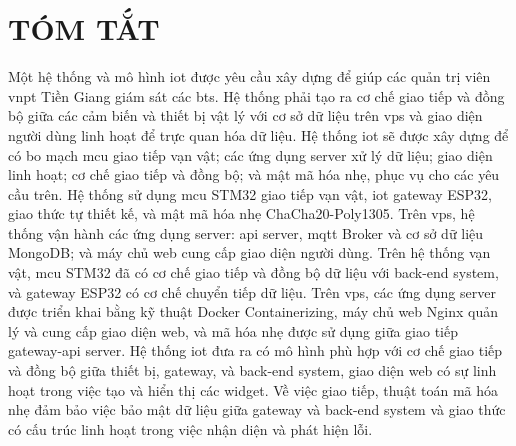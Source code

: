 \chapter*{TÓM TẮT}
\label{Abstract}

Một hệ thống và mô hình \acrfull{iot} được yêu cầu xây dựng để giúp các quản trị viên \acrfull{vnpt} Tiền Giang giám sát các \acrfull{bts}. Hệ thống phải tạo ra cơ chế giao tiếp và đồng bộ giữa các cảm biến và thiết bị vật lý với cơ sở dữ liệu trên \acrfull{vps} và giao diện người dùng linh hoạt để trực quan hóa dữ liệu. 
Hệ thống \acrshort{iot} sẽ được xây dựng để có bo mạch \acrfull{mcu} giao tiếp vạn vật; các ứng dụng server xử lý dữ liệu; giao diện linh hoạt; cơ chế giao tiếp và đồng bộ; và mật mã hóa nhẹ, phục vụ cho các yêu cầu trên.
Hệ thống sử dụng \acrshort{mcu} STM32 giao tiếp vạn vật, \acrshort{iot} gateway ESP32, giao thức tự thiết kế, và mật mã hóa nhẹ ChaCha20-Poly1305. Trên \acrshort{vps}, hệ thống vận hành các ứng dụng server: \acrfull{api} server, \acrfull{mqtt} Broker và cơ sở dữ liệu MongoDB; và máy chủ web cung cấp giao diện người dùng. 
Trên hệ thống vạn vật, \acrshort{mcu} STM32 đã có cơ chế giao tiếp và đồng bộ dữ liệu với back-end system, và gateway ESP32 có cơ chế chuyển tiếp dữ liệu. Trên \acrshort{vps}, các ứng dụng server được triển khai bằng kỹ thuật Docker Containerizing, máy chủ web Nginx quản lý và cung cấp giao diện web, và mã hóa nhẹ được sử dụng giữa giao tiếp gateway-\acrshort{api} server. 
Hệ thống \acrshort{iot} đưa ra có mô hình phù hợp với cơ chế giao tiếp và đồng bộ giữa thiết bị, gateway, và back-end system, giao diện web có sự linh hoạt trong việc tạo và hiển thị các widget. Về việc giao tiếp, thuật toán mã hóa nhẹ đảm bảo việc bảo mật dữ liệu giữa gateway và back-end system và giao thức có cấu trúc linh hoạt trong việc nhận diện và phát hiện lỗi.
